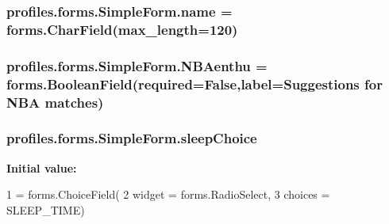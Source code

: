 \subsubsection[{\texorpdfstring{name}{name}}]{\setlength{\rightskip}{0pt plus 5cm}profiles.\+forms.\+Simple\+Form.\+name = forms.\+Char\+Field(max\+\_\+length=120)\hspace{0.3cm}{\ttfamily [static]}}\hypertarget{classprofiles_1_1forms_1_1SimpleForm_a27db91136cd11af5441ac0a5df111c24}{}\label{classprofiles_1_1forms_1_1SimpleForm_a27db91136cd11af5441ac0a5df111c24}
\subsubsection[{\texorpdfstring{N\+B\+Aenthu}{NBAenthu}}]{\setlength{\rightskip}{0pt plus 5cm}profiles.\+forms.\+Simple\+Form.\+N\+B\+Aenthu = forms.\+Boolean\+Field(required=False,label=\textquotesingle{}Suggestions for N\+BA matches\textquotesingle{})\hspace{0.3cm}{\ttfamily [static]}}\hypertarget{classprofiles_1_1forms_1_1SimpleForm_a791fd8196dfe174afb185e8f0357d807}{}\label{classprofiles_1_1forms_1_1SimpleForm_a791fd8196dfe174afb185e8f0357d807}
\subsubsection[{\texorpdfstring{sleep\+Choice}{sleepChoice}}]{\setlength{\rightskip}{0pt plus 5cm}profiles.\+forms.\+Simple\+Form.\+sleep\+Choice\hspace{0.3cm}{\ttfamily [static]}}\hypertarget{classprofiles_1_1forms_1_1SimpleForm_ad6fcf3df4c2d202e9a1c40f9e5f2c226}{}\label{classprofiles_1_1forms_1_1SimpleForm_ad6fcf3df4c2d202e9a1c40f9e5f2c226}
{\bfseries Initial value\+:}
\begin{DoxyCode}
1 = forms.ChoiceField(
2         widget = forms.RadioSelect,
3         choices = SLEEP\_TIME)
\end{DoxyCode}
